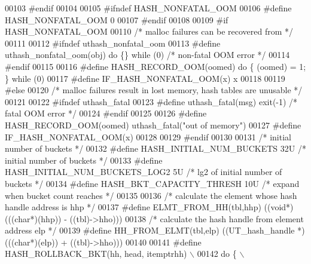 \begin{DoxyCode}
00103 \textcolor{preprocessor}{#endif}
00104 
00105 \textcolor{preprocessor}{#ifndef HASH\_NONFATAL\_OOM}
00106 \textcolor{preprocessor}{#define HASH\_NONFATAL\_OOM 0}
00107 \textcolor{preprocessor}{#endif}
00108 
00109 \textcolor{preprocessor}{#if HASH\_NONFATAL\_OOM}
00110 \textcolor{comment}{/* malloc failures can be recovered from */}
00111 
00112 \textcolor{preprocessor}{#ifndef uthash\_nonfatal\_oom}
00113 \textcolor{preprocessor}{#define uthash\_nonfatal\_oom(obj) do \{\} while (0)    }\textcolor{comment}{/* non-fatal OOM error */}\textcolor{preprocessor}{}
00114 \textcolor{preprocessor}{#endif}
00115 
00116 \textcolor{preprocessor}{#define HASH\_RECORD\_OOM(oomed) do \{ (oomed) = 1; \} while (0)}
00117 \textcolor{preprocessor}{#define IF\_HASH\_NONFATAL\_OOM(x) x}
00118 
00119 \textcolor{preprocessor}{#else}
00120 \textcolor{comment}{/* malloc failures result in lost memory, hash tables are unusable */}
00121 
00122 \textcolor{preprocessor}{#ifndef uthash\_fatal}
00123 \textcolor{preprocessor}{#define uthash\_fatal(msg) exit(-1)        }\textcolor{comment}{/* fatal OOM error */}\textcolor{preprocessor}{}
00124 \textcolor{preprocessor}{#endif}
00125 
00126 \textcolor{preprocessor}{#define HASH\_RECORD\_OOM(oomed) uthash\_fatal("out of memory")}
00127 \textcolor{preprocessor}{#define IF\_HASH\_NONFATAL\_OOM(x)}
00128 
00129 \textcolor{preprocessor}{#endif}
00130 
00131 \textcolor{comment}{/* initial number of buckets */}
00132 \textcolor{preprocessor}{#define HASH\_INITIAL\_NUM\_BUCKETS 32U     }\textcolor{comment}{/* initial number of buckets        */}\textcolor{preprocessor}{}
00133 \textcolor{preprocessor}{#define HASH\_INITIAL\_NUM\_BUCKETS\_LOG2 5U }\textcolor{comment}{/* lg2 of initial number of buckets */}\textcolor{preprocessor}{}
00134 \textcolor{preprocessor}{#define HASH\_BKT\_CAPACITY\_THRESH 10U     }\textcolor{comment}{/* expand when bucket count reaches */}\textcolor{preprocessor}{}
00135 
00136 \textcolor{comment}{/* calculate the element whose hash handle address is hhp */}
00137 \textcolor{preprocessor}{#define ELMT\_FROM\_HH(tbl,hhp) ((void*)(((char*)(hhp)) - ((tbl)->hho)))}
00138 \textcolor{comment}{/* calculate the hash handle from element address elp */}
00139 \textcolor{preprocessor}{#define HH\_FROM\_ELMT(tbl,elp) ((UT\_hash\_handle *)(((char*)(elp)) + ((tbl)->hho)))}
00140 
00141 \textcolor{preprocessor}{#define HASH\_ROLLBACK\_BKT(hh, head, itemptrhh)                                   \(\backslash\)}
00142 \textcolor{preprocessor}{do \{                                                                             \(\backslash\)}

\end{DoxyCode}
